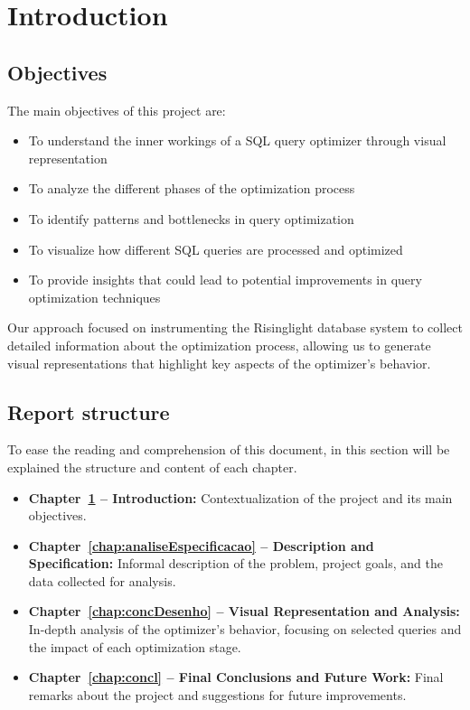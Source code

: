 \documentclass[a4paper,12pt]{scrreprt}
\begin{document}
\tableofcontents
\listoffigures

\chapter{Introduction}\label{chap:intro}

\section{Objectives}
The main objectives of this project are:
\begin{itemize}
    \item To understand the inner workings of a SQL query optimizer through visual representation
    \item To analyze the different phases of the optimization process
    \item To identify patterns and bottlenecks in query optimization
    \item To visualize how different SQL queries are processed and optimized
    \item To provide insights that could lead to potential improvements in query optimization techniques
\end{itemize}

Our approach focused on instrumenting the Risinglight database system to collect detailed information about the optimization process, allowing us to generate visual representations that highlight key aspects of the optimizer's behavior.

\newpage
\section{Report structure}
To ease the reading and comprehension of this document, in this section will be explained the structure and content of each chapter.

\begin{itemize}
    \item \textbf{Chapter~\ref{chap:intro} -- Introduction:} Contextualization of the project and its main objectives.
    \item \textbf{Chapter~\ref{chap:analiseEspecificacao} -- Description and Specification:} Informal description of the problem, project goals, and the data collected for analysis.
    \item \textbf{Chapter~\ref{chap:concDesenho} -- Visual Representation and Analysis:} In-depth analysis of the optimizer's behavior, focusing on selected queries and the impact of each optimization stage.
    \item \textbf{Chapter~\ref{chap:concl} -- Final Conclusions and Future Work:} Final remarks about the project and suggestions for future improvements.
\end{itemize}
\end{document}
